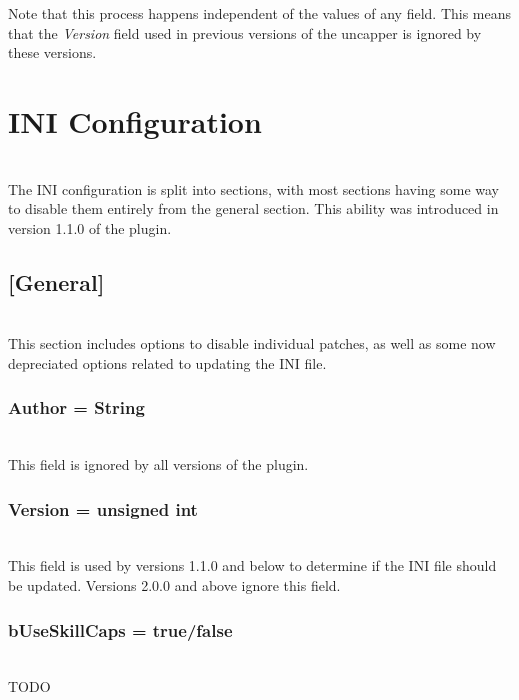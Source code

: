 \documentclass[12pt]{amsart}
\begin{document}
Note that this process happens independent of the values of any field. This
means that the \textit{Version} field used in previous versions of the uncapper
is ignored by these versions.
\stopblock

\startblock
\section{INI Configuration}\hfill\\

The INI configuration is split into sections, with most sections having some
way to disable them entirely from the general section. This ability was
introduced in version 1.1.0 of the plugin.
\stopblock

\startblock
\subsection{[General]}\hfill\\

This section includes options to disable individual patches, as well as some
now depreciated options related to updating the INI file.
\stopblock

\startblock
\subsubsection{Author = \textlangle String\textrangle}\hfill\\

This field is ignored by all versions of the plugin.
\stopblock

\startblock
\subsubsection{Version = \textlangle unsigned int\textrangle}\hfill\\

This field is used by versions 1.1.0 and below to determine if the INI file
should be updated. Versions 2.0.0 and above ignore this field.
\stopblock

\startblock
\subsubsection{bUseSkillCaps = \textlangle true/false\textrangle}\hfill\\

TODO

\stopblock
\end{document}
